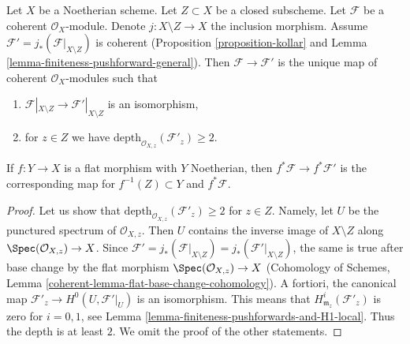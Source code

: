 \begin{lemma}
\label{lemma-get-depth-2-along-Z}
Let $X$ be a Noetherian scheme. Let $Z \subset X$ be a closed subscheme.
Let $\mathcal{F}$ be a coherent $\mathcal{O}_X$-module. Denote
$j : X \setminus Z \to X$ the inclusion morphism.
Assume $\mathcal{F}' = j_*(\mathcal{F}|_{X \setminus Z})$
is coherent (Proposition \ref{proposition-kollar} and
Lemma \ref{lemma-finiteness-pushforward-general}).
Then $\mathcal{F} \to \mathcal{F}'$ is the unique map
of coherent $\mathcal{O}_X$-modules such that
\begin{enumerate}
\item $\mathcal{F}|_{X \setminus Z} \to \mathcal{F}'|_{X \setminus Z}$
is an isomorphism,
\item for $z \in Z$ we have
$\text{depth}_{\mathcal{O}_{X, z}}(\mathcal{F}'_z) \geq 2$.
\end{enumerate}
If $f : Y \to X$ is a flat morphism with $Y$ Noetherian, then
$f^*\mathcal{F} \to f^*\mathcal{F}'$ is the corresponding
map for $f^{-1}(Z) \subset Y$ and $f^*\mathcal{F}$.
\end{lemma}

\begin{proof}
Let us show that $\text{depth}_{\mathcal{O}_{X, z}}(\mathcal{F}'_z) \geq 2$
for $z \in Z$. Namely, let $U$ be the punctured spectrum of
$\mathcal{O}_{X, z}$. Then $U$ contains the inverse image of
$X \setminus Z$ along $\Spec(\mathcal{O}_{X, z}) \to X$.
Since $\mathcal{F}' = j_*(\mathcal{F}|_{X \setminus Z}) =
j_*(\mathcal{F}'|_{X \setminus Z})$, the same is true after
base change by the flat morphism $\Spec(\mathcal{O}_{X, z}) \to X$
(Cohomology of Schemes, Lemma
\ref{coherent-lemma-flat-base-change-cohomology}).
A fortiori, the canonical map
$\mathcal{F}'_z \to H^0(U, \mathcal{F}'|_U)$
is an isomorphism. This means that $H^i_{\mathfrak m_z}(\mathcal{F}'_z)$
is zero for $i = 0, 1$, see
Lemma \ref{lemma-finiteness-pushforwards-and-H1-local}.
Thus the depth is at least $2$.
We omit the proof of the other statements.
\end{proof}

